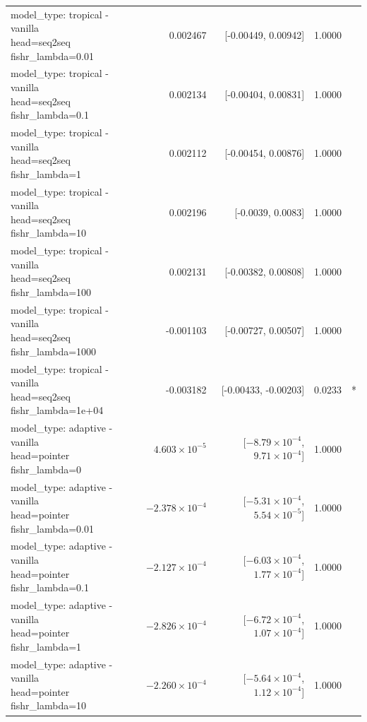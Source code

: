 \documentclass[10pt]{article}
\makeatletter
\newcommand{\stackcell}[1]{\begin{tabular}[t]{@{}l@{}}#1\end{tabular}}
\makeatother
\begin{document}
{\begin{longtable}{lrrrl}
\stackcell{model\_type: tropical - vanilla\\\footnotesize head=seq2seq fishr\_lambda=0.01 } & 0.002467 & [-0.00449, 0.00942] & 1.0000 & \\
\stackcell{model\_type: tropical - vanilla\\\footnotesize head=seq2seq fishr\_lambda=0.1 } & 0.002134 & [-0.00404, 0.00831] & 1.0000 & \\
\stackcell{model\_type: tropical - vanilla\\\footnotesize head=seq2seq fishr\_lambda=1 } & 0.002112 & [-0.00454, 0.00876] & 1.0000 & \\
\stackcell{model\_type: tropical - vanilla\\\footnotesize head=seq2seq fishr\_lambda=10 } & 0.002196 & [-0.0039, 0.0083] & 1.0000 & \\
\stackcell{model\_type: tropical - vanilla\\\footnotesize head=seq2seq fishr\_lambda=100 } & 0.002131 & [-0.00382, 0.00808] & 1.0000 & \\
\stackcell{model\_type: tropical - vanilla\\\footnotesize head=seq2seq fishr\_lambda=1000 } & -0.001103 & [-0.00727, 0.00507] & 1.0000 & \\
\stackcell{model\_type: tropical - vanilla\\\footnotesize head=seq2seq fishr\_lambda=1e+04 } & -0.003182 & [-0.00433, -0.00203] & 0.0233 & *\\
\stackcell{model\_type: adaptive - vanilla\\\footnotesize head=pointer fishr\_lambda=0 } & $4.603\times10^{-5}$ & [$-8.79\times10^{-4}$, $9.71\times10^{-4}$] & 1.0000 & \\
\stackcell{model\_type: adaptive - vanilla\\\footnotesize head=pointer fishr\_lambda=0.01 } & $-2.378\times10^{-4}$ & [$-5.31\times10^{-4}$, $5.54\times10^{-5}$] & 1.0000 & \\
\stackcell{model\_type: adaptive - vanilla\\\footnotesize head=pointer fishr\_lambda=0.1 } & $-2.127\times10^{-4}$ & [$-6.03\times10^{-4}$, $1.77\times10^{-4}$] & 1.0000 & \\
\stackcell{model\_type: adaptive - vanilla\\\footnotesize head=pointer fishr\_lambda=1 } & $-2.826\times10^{-4}$ & [$-6.72\times10^{-4}$, $1.07\times10^{-4}$] & 1.0000 & \\
\stackcell{model\_type: adaptive - vanilla\\\footnotesize head=pointer fishr\_lambda=10 } & $-2.260\times10^{-4}$ & [$-5.64\times10^{-4}$, $1.12\times10^{-4}$] & 1.0000 & \\

\end{longtable}}
\end{document}
